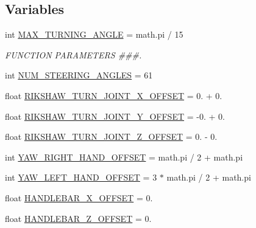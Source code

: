 \subsection*{Variables}
\begin{DoxyCompactItemize}
\item 
int \mbox{\hyperlink{namespacecapture__steering__trajectory_a5e8a80de7d6afe9aa53c988c9fbaa688}{M\+A\+X\+\_\+\+T\+U\+R\+N\+I\+N\+G\+\_\+\+A\+N\+G\+LE}} = math.\+pi / 15
\begin{DoxyCompactList}\small\item\em F\+U\+N\+C\+T\+I\+ON P\+A\+R\+A\+M\+E\+T\+E\+RS \#\#\#. \end{DoxyCompactList}\item 
int \mbox{\hyperlink{namespacecapture__steering__trajectory_a577bb4ca1767e765779899e76c8e508a}{N\+U\+M\+\_\+\+S\+T\+E\+E\+R\+I\+N\+G\+\_\+\+A\+N\+G\+L\+ES}} = 61
\item 
float \mbox{\hyperlink{namespacecapture__steering__trajectory_ac9189f0f86c6d14192dc2b5c2f1dae58}{R\+I\+K\+S\+H\+A\+W\+\_\+\+T\+U\+R\+N\+\_\+\+J\+O\+I\+N\+T\+\_\+\+X\+\_\+\+O\+F\+F\+S\+ET}} = 0. + 0.
\item 
float \mbox{\hyperlink{namespacecapture__steering__trajectory_a76e8e7e1051dfd83392e5b8738e6ed4f}{R\+I\+K\+S\+H\+A\+W\+\_\+\+T\+U\+R\+N\+\_\+\+J\+O\+I\+N\+T\+\_\+\+Y\+\_\+\+O\+F\+F\+S\+ET}} = -\/0. + 0.
\item 
float \mbox{\hyperlink{namespacecapture__steering__trajectory_a3ecd75192c8e9783036bfa7f2b8811e8}{R\+I\+K\+S\+H\+A\+W\+\_\+\+T\+U\+R\+N\+\_\+\+J\+O\+I\+N\+T\+\_\+\+Z\+\_\+\+O\+F\+F\+S\+ET}} = 0. -\/ 0.
\item 
int \mbox{\hyperlink{namespacecapture__steering__trajectory_a155c6dbed0782a0b790a35f8ce5a5491}{Y\+A\+W\+\_\+\+R\+I\+G\+H\+T\+\_\+\+H\+A\+N\+D\+\_\+\+O\+F\+F\+S\+ET}} = math.\+pi / 2 + math.\+pi
\item 
int \mbox{\hyperlink{namespacecapture__steering__trajectory_a98ef53a579ce38fb61421435d21bfba1}{Y\+A\+W\+\_\+\+L\+E\+F\+T\+\_\+\+H\+A\+N\+D\+\_\+\+O\+F\+F\+S\+ET}} = 3 $\ast$ math.\+pi / 2 + math.\+pi
\item 
float \mbox{\hyperlink{namespacecapture__steering__trajectory_a53868818ec7229652d783207f4756dfd}{H\+A\+N\+D\+L\+E\+B\+A\+R\+\_\+\+X\+\_\+\+O\+F\+F\+S\+ET}} = 0.
\item 
float \mbox{\hyperlink{namespacecapture__steering__trajectory_a4ebecaa7f8e75823cbf2cee700ca6c45}{H\+A\+N\+D\+L\+E\+B\+A\+R\+\_\+\+Z\+\_\+\+O\+F\+F\+S\+ET}} = 0.

\end{DoxyCompactItemize}
